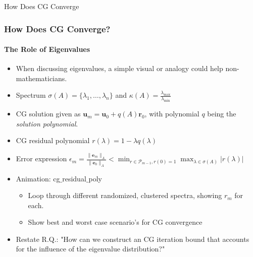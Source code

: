 \begin{frame}[label=cg_convergence]{How Does CG Converge}
    \frametitle{How Does CG Converge?}
    \framesubtitle{The Role of Eigenvalues}
        \begin{itemize}
            \item<1-> When discussing eigenvalues, a simple visual or analogy could help non-mathematicians.
            \item<2-> Spectrum $\sigma(A) = \{\lambda_1, \ldots, \lambda_n\}$ and $\kappa(A) = \frac{\lambda_{\max}}{\lambda_{\min}}$
            \item<3-> CG solution given as $\mathbf{u}_m = \mathbf{u}_0 + q(A)\mathbf{r}_0$, with polynomial $q$ being the \textit{solution polynomial}.
            \item<4-> CG residual polynomial $r(\lambda) = 1 - \lambda q(\lambda)$
            \item<5-> Error expression $\epsilon_m = \frac{\|\mathbf{e}_m\|_A}{\|\mathbf{e}_0\|_A} < \min_{r \in \mathcal{P}_{m-1}, r(0) = 1} \max_{\lambda \in \sigma(A)} |r(\lambda)|$
            \item<6-> Animation: cg$\_$residual$\_$poly
                  \begin{itemize}
                      \item<6-> Loop through different randomized, clustered spectra, showing $r_m$ for each.
                      \item<6-> Show best and worst case scenario's for CG convergence
                  \end{itemize}
            \item<7-> Restate R.Q.: "How can we construct an CG iteration bound that accounts for the influence of the eigenvalue distribution?"
        \end{itemize}
\end{frame}